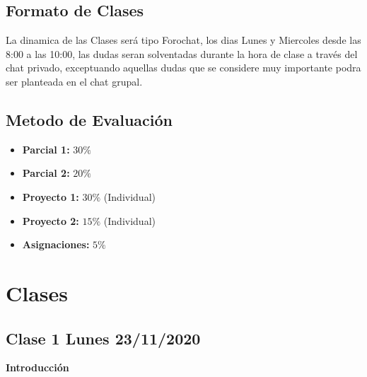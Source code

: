 \documentclass[11pt,letterpaper]{article}
\begin{document}
\subsection{Formato de Clases}
La dinamica de las Clases será tipo Forochat, los dias Lunes y Miercoles desde las 8:00 a las 10:00, las dudas seran solventadas durante la hora de clase a través del chat privado, exceptuando aquellas dudas que se considere muy importante podra ser planteada en el chat grupal.
\subsection{Metodo de Evaluación}

\begin{itemize}
	\item \textbf{Parcial 1:} $30\%$
	\item \textbf{Parcial 2:} $20\%$
	\item \textbf{Proyecto 1:} $30\%$ (Individual)
	\item \textbf{Proyecto 2:} $15\%$ (Individual)
	\item \textbf{Asignaciones:} $5\%$
	
	
\end{itemize}
\section{Clases}
\subsection{Clase 1 Lunes 23/11/2020}
\textbf{Introducción}
\end{document}
